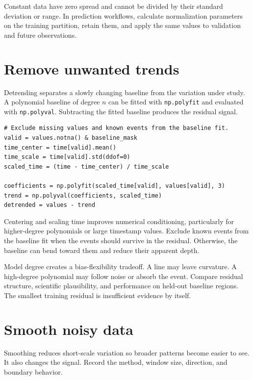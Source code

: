 \documentclass[11pt,letterpaper]{article}
\begin{document}
Constant data have zero spread and cannot be divided by their standard deviation
or range. In prediction workflows, calculate normalization parameters on the
training partition, retain them, and apply the same values to validation and
future observations.

\section{Remove unwanted trends}

Detrending separates a slowly changing baseline from the variation under study.
A polynomial baseline of degree $n$ can be fitted with \texttt{np.polyfit} and
evaluated with \texttt{np.polyval}. Subtracting the fitted baseline produces the
residual signal.

\begin{lstlisting}
# Exclude missing values and known events from the baseline fit.
valid = values.notna() & baseline_mask
time_center = time[valid].mean()
time_scale = time[valid].std(ddof=0)
scaled_time = (time - time_center) / time_scale

coefficients = np.polyfit(scaled_time[valid], values[valid], 3)
trend = np.polyval(coefficients, scaled_time)
detrended = values - trend
\end{lstlisting}

Centering and scaling time improves numerical conditioning, particularly for
higher-degree polynomials or large timestamp values. Exclude known events from
the baseline fit when the events should survive in the residual. Otherwise, the
baseline can bend toward them and reduce their apparent depth.

Model degree creates a bias-flexibility tradeoff. A line may leave curvature. A
high-degree polynomial may follow noise or absorb the event. Compare residual
structure, scientific plausibility, and performance on held-out baseline regions.
The smallest training residual is insufficient evidence by itself.

\section{Smooth noisy data}

Smoothing reduces short-scale variation so broader patterns become easier to
see. It also changes the signal. Record the method, window size, direction, and
boundary behavior.
\end{document}
